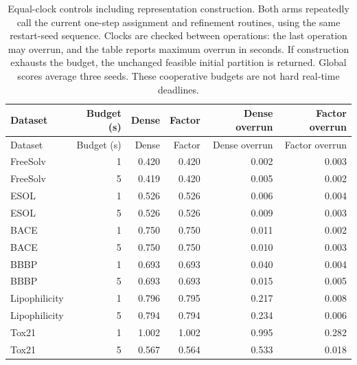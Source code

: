 \begin{longtable}{lrrrrr}
\caption{Equal-clock controls including representation construction. Both arms repeatedly call the current one-step assignment and refinement routines, using the same restart-seed sequence. Clocks are checked between operations: the last operation may overrun, and the table reports maximum overrun in seconds. If construction exhausts the budget, the unchanged feasible initial partition is returned. Global scores average three seeds. These cooperative budgets are not hard real-time deadlines.}\\
\toprule
Dataset & Budget (s) & Dense & Factor & Dense overrun & Factor overrun\\\midrule
\endfirsthead
\toprule
Dataset & Budget (s) & Dense & Factor & Dense overrun & Factor overrun\\\midrule
\endhead
\midrule\endfoot
\bottomrule\endlastfoot
FreeSolv & 1 & 0.420 & 0.420 & 0.002 & 0.003\\
FreeSolv & 5 & 0.419 & 0.420 & 0.005 & 0.002\\
ESOL & 1 & 0.526 & 0.526 & 0.006 & 0.004\\
ESOL & 5 & 0.526 & 0.526 & 0.009 & 0.003\\
BACE & 1 & 0.750 & 0.750 & 0.011 & 0.002\\
BACE & 5 & 0.750 & 0.750 & 0.010 & 0.003\\
BBBP & 1 & 0.693 & 0.693 & 0.040 & 0.004\\
BBBP & 5 & 0.693 & 0.693 & 0.015 & 0.005\\
Lipophilicity & 1 & 0.796 & 0.795 & 0.217 & 0.008\\
Lipophilicity & 5 & 0.794 & 0.794 & 0.234 & 0.006\\
Tox21 & 1 & 1.002 & 1.002 & 0.995 & 0.282\\
Tox21 & 5 & 0.567 & 0.564 & 0.533 & 0.018\\
\end{longtable}
